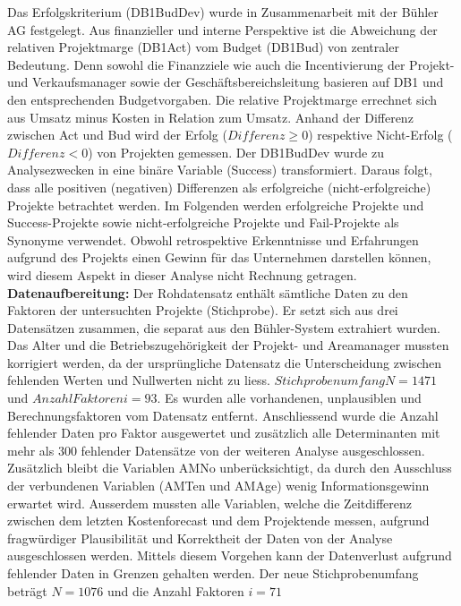 \newline Das Erfolgskriterium (DB1BudDev) wurde in Zusammenarbeit mit der Bühler AG festgelegt. Aus finanzieller und interne Perspektive ist die Abweichung der relativen Projektmarge (DB1Act) vom Budget (DB1Bud) von zentraler Bedeutung. Denn sowohl die Finanzziele wie auch die Incentivierung der Projekt- und Verkaufsmanager sowie der Geschäftsbereichsleitung basieren auf DB1 und den entsprechenden Budgetvorgaben. Die relative Projektmarge errechnet sich aus Umsatz minus Kosten in Relation zum Umsatz. Anhand der Differenz zwischen Act und Bud wird der Erfolg ($Differenz \geq 0$) respektive Nicht-Erfolg ($Differenz < 0$) von Projekten gemessen. Der DB1BudDev wurde zu Analysezwecken in eine binäre Variable (Success) transformiert. Daraus folgt, dass alle positiven (negativen) Differenzen als erfolgreiche (nicht-erfolgreiche) Projekte betrachtet werden. Im Folgenden werden erfolgreiche Projekte und Success-Projekte sowie nicht-erfolgreiche Projekte und Fail-Projekte als Synonyme verwendet. Obwohl retrospektive Erkenntnisse und Erfahrungen aufgrund des Projekts einen Gewinn für das Unternehmen darstellen können, wird diesem Aspekt in dieser Analyse nicht Rechnung getragen. 
\newline\newline\textbf{Datenaufbereitung:} Der Rohdatensatz enthält sämtliche Daten zu den Faktoren der untersuchten Projekte (Stichprobe). Er setzt sich aus drei Datensätzen zusammen, die separat aus den Bühler-System extrahiert wurden. Das Alter und die Betriebszugehörigkeit der Projekt- und Areamanager mussten korrigiert werden, da der ursprüngliche Datensatz die Unterscheidung zwischen fehlenden Werten und Nullwerten nicht zu liess.
\newline\newline $Stichprobenumfang N = 1471$ und $Anzahl Faktoren i = 93$.
\newline\newline
Es wurden alle vorhandenen, unplausiblen und Berechnungsfaktoren vom Datensatz entfernt. Anschliessend wurde die Anzahl fehlender Daten pro Faktor ausgewertet und zusätzlich alle Determinanten mit mehr als 300 fehlender Datensätze von der weiteren Analyse ausgeschlossen. Zusätzlich bleibt die Variablen AMNo unberücksichtigt, da durch den Ausschluss der verbundenen Variablen (AMTen und AMAge) wenig Informationsgewinn erwartet wird. Ausserdem mussten alle Variablen, welche die Zeitdifferenz zwischen dem letzten Kostenforecast und dem Projektende messen, aufgrund fragwürdiger Plausibilität und Korrektheit der Daten von der Analyse ausgeschlossen werden. Mittels diesem Vorgehen kann der Datenverlust aufgrund fehlender Daten in Grenzen gehalten werden. Der neue Stichprobenumfang beträgt $N = 1076$ und die Anzahl Faktoren $i = 71$
